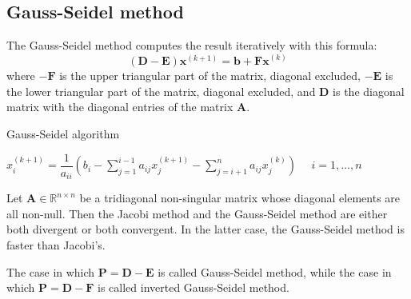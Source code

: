 \documentclass[12pt, a4paper]{report}
\newtheorem[style=M,bodystyle=\normalfont]{theorem}{Theorem}
\newtheorem[style=M,bodystyle=\normalfont]{proposition}{Proposition}
\newtheorem[style=M,bodystyle=\normalfont]{corollary}{Corollary}
\newtheorem[style=M,bodystyle=\normalfont]{lemma}{Lemma}
\newtheorem[style=M,bodystyle=\normalfont]{definition}{Definition}
\begin{document}
    \subsection{Gauss-Seidel method}
    The Gauss-Seidel method computes the result iteratively with this formula: 
    \[\left(\boldsymbol{D}-\boldsymbol{E}\right)\boldsymbol{x}^{(k+1)}=\boldsymbol{b}+\boldsymbol{Fx}^{(k)}\]
    where $-\boldsymbol{F}$ is the upper triangular part of the matrix, diagonal excluded, $-\boldsymbol{E}$ is the lower triangular part of the matrix, diagonal excluded, and
    $\boldsymbol{D}$ is the diagonal matrix with the diagonal entries of the matrix $\boldsymbol{A}$. 
    \begin{algorithm}[H]
        \caption{Gauss-Seidel algorithm}
            \begin{algorithmic}[1]
                \State $x_i^{(k+1)}=\dfrac{1}{a_{ii}}\left( b_i-\sum_{j=1}^{i-1}a_{ij}x_j^{(k+1)}-\sum_{j=i+1}^{n}a_{ij}x_j^{(k)}\right) \:\:\:\:\:\: i=1,\dots,n $
            \end{algorithmic}
    \end{algorithm}
    \begin{proposition}
        Let $\boldsymbol{A} \in \mathbb{R}^{n \times n}$ be a tridiagonal non-singular matrix whose diagonal elements are all non-null. Then the Jacobi method and the 
        Gauss-Seidel method are either both divergent or both convergent. In the latter case, the Gauss-Seidel method is faster than Jacobi's. 
    \end{proposition}
    The case in which $\boldsymbol{P}=\boldsymbol{D}-\boldsymbol{E}$ is called Gauss-Seidel method, while the case in which $\boldsymbol{P}=\boldsymbol{D}-\boldsymbol{F}$
    is called inverted Gauss-Seidel method. 
\end{document}
